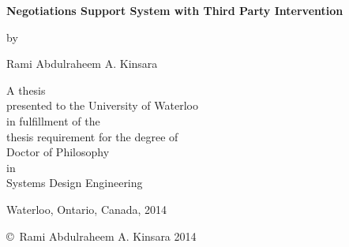 \documentclass[letterpaper,12pt,titlepage,oneside,final]{book}
\begin{document}
\label{TITLE}
\begin{titlepage}
        \begin{center}
        \vspace*{0.5cm}

        \Huge
        {\bf  Negotiations Support System with Third Party Intervention}

        \vspace*{0.5cm}

        \normalsize
        by \\

        \vspace*{0.5cm}

        \Large
        Rami Abdulraheem A. Kinsara \\
        \vspace*{0.5cm}

        \normalsize
        A thesis \\
        presented to the University of Waterloo \\ 
        in fulfillment of the \\
        thesis requirement for the degree of \\
        Doctor of Philosophy \\
        in \\
        Systems Design Engineering \\

        \vspace*{0.5cm}

        Waterloo, Ontario, Canada, 2014 \\

        \vspace*{0.5cm}

        \copyright\ Rami Abdulraheem A. Kinsara 2014 \\
        
        \vspace{0.5cm}
        
	     
        \end{center}
\end{titlepage}

\pagestyle{plain}
\setcounter{page}{2}
\end{document}
